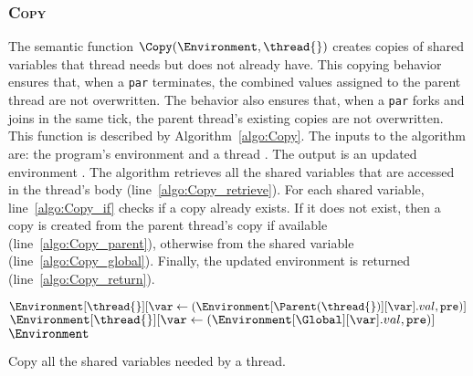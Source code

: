 \subsubsection{\textsc{Copy}}
\label{sec:forec_Copy}
The semantic function $\Copy(\Environment, \thread{})$ creates 
copies of shared variables that thread \thread{} needs but 
does not already have. This copying behavior ensures that, 
when a \verb$par$ terminates, the combined values assigned to the 
parent thread are not overwritten. The behavior also ensures
that, when a \verb$par$ forks and joins in the same tick, 
the parent thread's existing copies are not overwritten.
This function is described by Algorithm~\ref{algo:Copy}. 
The inputs to the algorithm are: the program's environment 
\Environment{} and a thread \thread{}. The output is an updated
environment \Environment{}. The algorithm retrieves all the shared 
variables that are accessed in the thread's body (line~\ref{algo:Copy_retrieve}).
For each shared variable, line~\ref{algo:Copy_if} checks if a
copy already exists. If it does not exist, then a copy is created 
from the parent thread's copy if available (line~\ref{algo:Copy_parent}), 
otherwise from the shared variable (line~\ref{algo:Copy_global}).  
Finally, the updated environment \Environment{} is returned (line~\ref{algo:Copy_return}).

\begin{algorithm}[t]
	\begin{algorithmic}[1]
		\Function{$\Copy$}{\Environment{}, \thread{}}
			\ForAll {$\var \in \Shared(\thread{})$}						\label{algo:Copy_retrieve}
				\If {$\var \notin \Environment[\thread{}]$}				\label{algo:Copy_if}
					\If {$\var \in \Environment[\Parent(\thread{})]$}
						\State $\Environment[\thread{}][\var \gets (\Environment[\Parent(\thread{})][\var].val, \texttt{pre})]$	\label{algo:Copy_parent}
					\Else
						\State $\Environment[\thread{}][\var \gets (\Environment[\Global][\var].val, \texttt{pre})]$			\label{algo:Copy_global}
					\EndIf
				\EndIf
			\EndFor
			\State \Return $\Environment$		\label{algo:Copy_return}
		\EndFunction
	\end{algorithmic}
	
	\caption{Copy all the shared variables needed by a thread.}
	\label{algo:Copy}
\end{algorithm}

